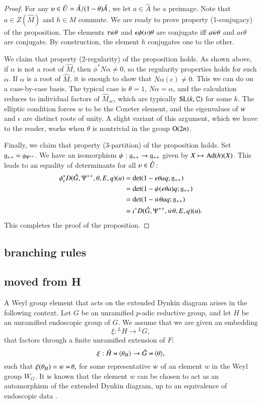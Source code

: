 \begin{proof}
For any $\upsilon\in \hat U = \hat A/(1-\theta)\hat A$, we let $a\in \hat A$ be a
preimage.  Note that $a\in Z(\hat M)$ and $h\in \hat M$ commute.  We
are ready to prove property (1-conjugacy) of the proposition.  The
elements $\tau\dot w\theta$ and $\epsilon\phi(\upsilon)\theta$ are conjugate
iff $a\dot w\theta$ and $a\epsilon \theta$ are conjugate.  By
construction, the element $h$ conjugates one to the other.

We claim that property (2-regularity) of the proposition holds.  As
shown above, if $\alpha$ is not a root of $\hat M$, then
$\phi^*N\alpha\ne 0$, so the regularity properties holds for such
$\alpha$.  If $\alpha$ is a root of $\hat M$, it is enough to show
that $N\alpha(\epsilon)\ne0$.  This we can do on a case-by-case basis.
The typical case is $\theta=1$, $N\alpha = \alpha$, and the
calculation reduces to individual factors of $\hat M_{sc}$, which are
typically ${\operatorname{SL}}(k,\mathbb{C})$ for some $k$. The elliptic condition forces
$w$ to be the Coxeter element, and the eigenvalues of $\dot w$ and
$\epsilon$ are distinct roots of unity.  A slight variant of this
argument, which we leave to the reader, works when $\theta$ is
nontrivial in the group ${\operatorname{O}}(2n)$.

Finally, we claim that property (3-partition) of the proposition
holds.  Set ${\mathfrak g}_{++}={\mathfrak g}_{\Psi^{++}}$.
We have an isomorphism $\psi:{\mathfrak g}_{++}\to {\mathfrak g}_{++}$ given by
$X\mapsto {\operatorname{Ad}}(h)(X)$.  This leads to an equality of determinants for
all $\upsilon\in \hat U$:
\begin{align*}
\phi^*_\epsilon D(\hat G,\Psi^{++},\theta,E,q) (u) &=
\det(1- \epsilon \theta a q;{\mathfrak g}_{++}) \\ &=
\det(1-\psi(\epsilon\theta a) q;{\mathfrak g}_{++}) \\ &=
\det(1-\dot w \theta a q;{\mathfrak g}_{++}) \\ &=
\iota^* D(\hat G,\Psi^{++},\dot w\theta,E,q)(u).
\end{align*}
This completes the proof of the proposition.
\end{proof}


\subsection{branching rules}\label{sec:branch}

\subsection{moved from H}


A Weyl group element that acts on the extended Dynkin diagram arises
in the following context.  Let $G$ be an unramified $p$-adic reductive
group, and let $H$ be an unramified endoscopic group of $G$.  We
assume that we are given an embedding
\[
\xi:{}^LH\to {}^LG,
\]
that factors through a finite unramified extension of $F$:
\[
\xi:\hat H\rtimes \langle{\theta_H}\rangle\to \hat G\rtimes \langle{\theta}\rangle,
\]
such that $\xi(\theta_H) = \dot w \rtimes \theta,$ for some
representative $\dot w $ of an element $w$ in the Weyl group $W_G$.  It
is known that the element $w$ can be chosen 
to act as an automorphism of the extended Dynkin diagram,
up to an equivalence of endoscopic data
\cite[\S4.7]{hales1993simple}.

